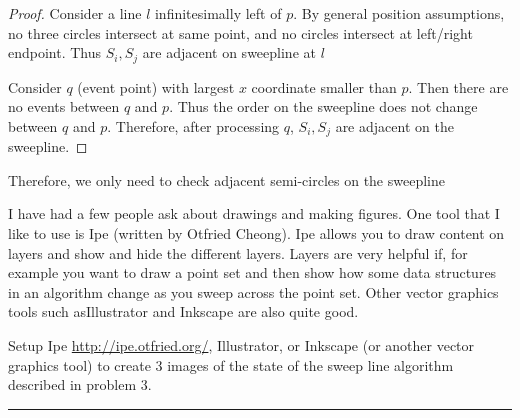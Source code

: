 \documentclass[11pt]{article}
\begin{document}
\begin{proof}
    Consider a line $l$ infinitesimally left of $p$. By general position assumptions, 
    no three circles intersect at same point, and no circles intersect at left/right endpoint.
    Thus $S_i, S_j$ are adjacent on sweepline at $l$

    Consider $q$ (event point) with largest $x$ coordinate smaller than $p$.
    Then there are no events between $q$ and $p$. Thus the order on the sweepline does not change between $q$ and $p$.
    Therefore, after processing $q$, $S_i, S_j$ are adjacent on the sweepline.
\end{proof}

Therefore, we only need to check adjacent semi-circles on the sweepline


I have had a few people ask about drawings and making figures.  One tool that I
like to use is Ipe (written by Otfried Cheong).  Ipe allows you to draw content
on layers and show and hide the different layers.  Layers are very helpful if,
for example you want to draw a point set and then show how some data structures
in an algorithm change as you sweep across the point set.
Other vector graphics tools such asIllustrator and Inkscape are also quite good.

Setup Ipe \url{http://ipe.otfried.org/}, Illustrator, or Inkscape
(or another vector graphics tool)
to create 3 images of the state of the sweep line algorithm
described in problem 3.

\hrule
\end{document}
